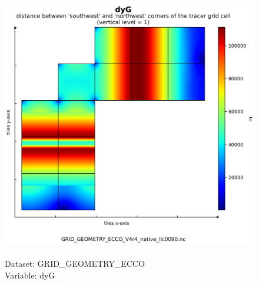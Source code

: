 \begin{figure}[H]
\centering
\includegraphics[scale=0.5]{../images/plots/native_plots_coords/Geometry_Parameters_for_the_Lat-Lon-Cap_90_(llc90)_Native_Model_Grid_(Version_4_Release_4)/dyG.png}
\caption{\\Dataset: GRID\_GEOMETRY\_ECCO\\Variable: dyG}
\label{tab:table-GRID_GEOMETRY_ECCO_dyG-Plot}
\end{figure}
\pagebreak
